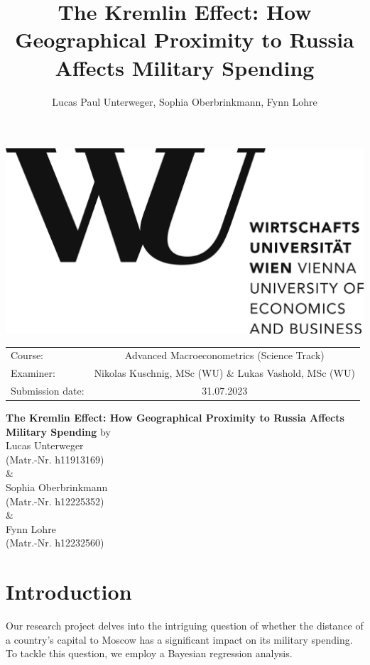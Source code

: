 \documentclass[12pt,a4paper]{article}
\author{Lucas Paul Unterweger, Sophia Oberbrinkmann, Fynn Lohre}
\title{The Kremlin Effect: How Geographical Proximity to Russia Affects Military Spending}
\begin{document}
\begin{titlepage}
\center
\vfill
\includegraphics[scale=0.08]{WU.png}
\vfill
\begin{tabular}[t]{lc}
Course:  & Advanced Macroeconometrics (Science Track) \\
Examiner: & 
Nikolas Kuschnig, MSc (WU) \& Lukas Vashold, MSc (WU) \\
Submission date: & 31.07.2023 \\
\end{tabular}
\vfill
{\large \textbf{The Kremlin Effect: How Geographical Proximity to Russia Affects Military Spending}}
\vfill
by\\ \vspace{3mm}
{\Large Lucas Unterweger}\\
(Matr.-Nr. h11913169)\\ \vspace{3mm}
\& \\ \vspace{3mm}
{\Large Sophia Oberbrinkmann}\\
(Matr.-Nr. h12225352)\\ \vspace{3mm}
\& \\ \vspace{3mm}
{\Large Fynn Lohre}\\
(Matr.-Nr. h12232560)\
\vfill

\thispagestyle{empty}
\pagebreak
\end{titlepage}
\thispagestyle{plain}
\tableofcontents
\pagebreak
{}
\section{Introduction}
Our research project delves into the intriguing question of whether the distance of a country's capital to Moscow has a significant impact on its military spending. To tackle this question, we employ a Bayesian regression analysis.
\end{document}
